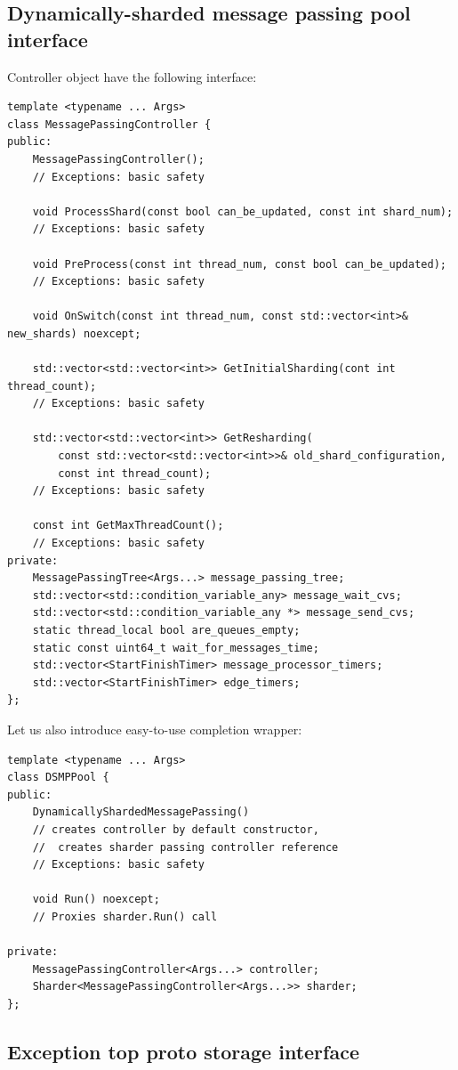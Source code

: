 \documentclass{article}
\begin{document}
\subsection{Dynamically-sharded message passing pool interface}
Controller object have the following interface:
\begin{lstlisting}
template <typename ... Args>
class MessagePassingController {
public:
	MessagePassingController();
	// Exceptions: basic safety

	void ProcessShard(const bool can_be_updated, const int shard_num);
	// Exceptions: basic safety

	void PreProcess(const int thread_num, const bool can_be_updated);
	// Exceptions: basic safety

	void OnSwitch(const int thread_num, const std::vector<int>& new_shards) noexcept;

	std::vector<std::vector<int>> GetInitialSharding(cont int thread_count);
	// Exceptions: basic safety

	std::vector<std::vector<int>> GetResharding(
		const std::vector<std::vector<int>>& old_shard_configuration,
		const int thread_count);
	// Exceptions: basic safety

	const int GetMaxThreadCount();
	// Exceptions: basic safety
private:
	MessagePassingTree<Args...> message_passing_tree;
	std::vector<std::condition_variable_any> message_wait_cvs;
	std::vector<std::condition_variable_any *> message_send_cvs;
	static thread_local bool are_queues_empty;
	static const uint64_t wait_for_messages_time;
	std::vector<StartFinishTimer> message_processor_timers;
	std::vector<StartFinishTimer> edge_timers;
};
\end{lstlisting}

Let us also introduce easy-to-use completion wrapper:
\begin{lstlisting}
template <typename ... Args>
class DSMPPool {
public:
	DynamicallyShardedMessagePassing()
	// creates controller by default constructor,
	// 	creates sharder passing controller reference
	// Exceptions: basic safety

	void Run() noexcept;
	// Proxies sharder.Run() call

private:
	MessagePassingController<Args...> controller;
	Sharder<MessagePassingController<Args...>> sharder;
};
\end{lstlisting}

\subsection{Exception top proto storage interface}
\end{document}

